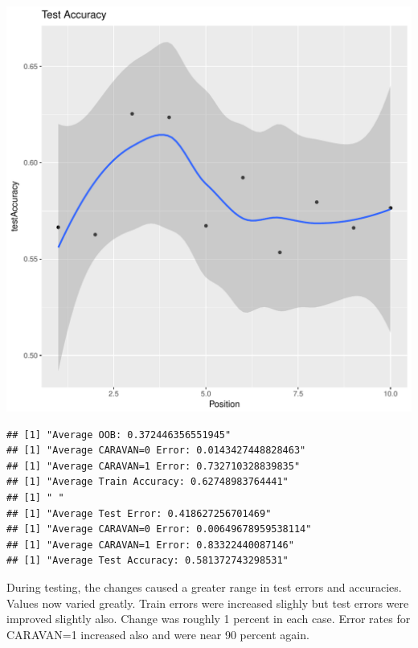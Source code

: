 \documentclass{article}\usepackage[]{graphicx}\usepackage[]{color}
\makeatletter
\def\maxwidth{ %
  \ifdim\Gin@nat@width>\linewidth
    \linewidth
  \else
    \Gin@nat@width
  \fi
}
\newenvironment{kframe}{%
 \def\at@end@of@kframe{}%
 \ifinner\ifhmode%
  \def\at@end@of@kframe{\end{minipage}}%
  \begin{minipage}{\columnwidth}%
 \fi\fi%
 \def\FrameCommand##1{\hskip\@totalleftmargin \hskip-\fboxsep
 \colorbox{shadecolor}{##1}\hskip-\fboxsep
     \hskip-\linewidth \hskip-\@totalleftmargin \hskip\columnwidth}%
 \MakeFramed {\advance\hsize-\width
   \@totalleftmargin\z@ \linewidth\hsize
   \@setminipage}}%
 {\par\unskip\endMakeFramed%
 \at@end@of@kframe}
\newenvironment{knitrout}{}{} %
\makeatother
\begin{document}
\begin{knitrout}
\begin{kframe}
{\ttfamily\noindent\itshape\color{messagecolor}{\#\# `geom\_smooth()` using method = 'loess'}}\end{kframe}
\includegraphics[width=\maxwidth]{figure/unnamed-chunk-35-8} 
\begin{kframe}\begin{verbatim}
## [1] "Average OOB: 0.372446356551945"
## [1] "Average CARAVAN=0 Error: 0.0143427448828463"
## [1] "Average CARAVAN=1 Error: 0.732710328839835"
## [1] "Average Train Accuracy: 0.62748983764441"
## [1] " "
## [1] "Average Test Error: 0.418627256701469"
## [1] "Average CARAVAN=0 Error: 0.00649678959538114"
## [1] "Average CARAVAN=1 Error: 0.83322440087146"
## [1] "Average Test Accuracy: 0.581372743298531"
\end{verbatim}
\end{kframe}
\end{knitrout}
During testing, the changes caused a greater range in test errors and accuracies. Values now varied greatly. Train errors were increased slighly but test errors were improved slightly also. Change was roughly 1 percent in each case. Error rates for CARAVAN=1 increased also and were near 90 percent again. 
\end{document}
